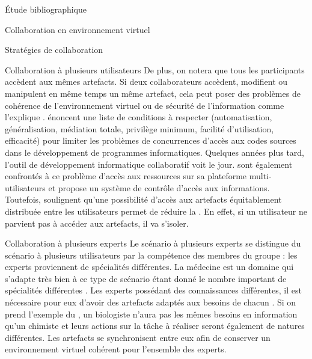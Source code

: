\documentclass[myfrancais,ngerman,english,french]{mythesis}
\begin{document}
\begin{mychapter}{Étude bibliographique}
\begin{mysection}{Collaboration en environnement virtuel}
\begin{mysubsection}{Stratégies de collaboration}
\begin{mysubsubsection}{Collaboration à plusieurs utilisateurs}
					De plus, on notera que tous les participants accèdent aux mêmes artefacts.
					Si deux collaborateurs accèdent, modifient ou manipulent en même temps un même artefact, cela peut poser des problèmes de cohérence de l'environnement virtuel ou de sécurité de l'information comme l'explique .
					 énoncent une liste de conditions à respecter (automatisation, généralisation, médiation totale, privilège minimum, facilité d'utilisation, efficacité) pour limiter les problèmes de concurrences d'accès aux codes sources dans le développement de programmes informatiques.
					Quelques années plus tard, l'outil de développement informatique collaboratif  voit le jour.
					 sont également confrontés à ce problème d'accès aux ressources sur sa plateforme multi-utilisateurs \myMARE et propose un système de contrôle d'accès aux informations.
					Toutefois,  soulignent qu'une possibilité d'accès aux artefacts équitablement distribuée entre les utilisateurs permet de réduire la .
					En effet, si un utilisateur ne parvient pas à accéder aux artefacts, il va s'isoler.
				\end{mysubsubsection}
				\begin{mysubsubsection}{Collaboration à plusieurs experts}
					Le scénario à plusieurs experts se distingue du scénario à plusieurs utilisateurs par la compétence des membres du groupe : les experts proviennent de spécialités différentes.
					La médecine est un domaine qui s'adapte très bien à ce type de scénario étant donné le nombre important de spécialités différentes .
					Les experts possédant des connaissances différentes, il est nécessaire pour eux d'avoir des artefacts adaptés aux besoins de chacun .
					Si on prend l'exemple du , un biologiste n'aura pas les mêmes besoins en information qu'un chimiste et leurs actions sur la tâche à réaliser seront également de natures différentes.
					Les artefacts se synchronisent entre eux afin de conserver un environnement virtuel cohérent pour l'ensemble des experts.


\end{mysubsubsection}
\end{mysubsection}
\end{mysection}
\end{mychapter}
\end{document}
